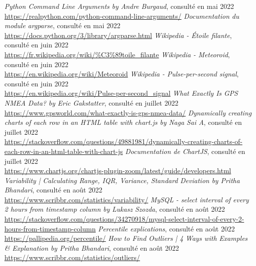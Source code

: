 \documentclass[11pt]{article}
\begin{document}
\begin{thebibliography}{100}
    \textit{Python Command Line Arguments by Andre Burgaud}, consulté en mai 2022\\\url{https://realpython.com/python-command-line-arguments/}
    \textit{Documentation du module argparse}, consulté en mai 2022\\\url{https://docs.python.org/3/library/argparse.html}
    \textit{Wikipedia - Étoile filante}, consulté en juin 2022\\\url{https://fr.wikipedia.org/wiki/%C3%89toile_filante}
    \textit{Wikipedia - Meteoroid}, consulté en juin 2022\\\url{https://en.wikipedia.org/wiki/Meteoroid}
    \textit{Wikipedia - Pulse-per-second signal}, consulté en juin 2022\\\url{https://en.wikipedia.org/wiki/Pulse-per-second_signal}
    \textit{What Exactly Is GPS NMEA Data? by Eric Gakstatter}, consulté en juillet 2022\\\url{https://www.gpsworld.com/what-exactly-is-gps-nmea-data/}
    \textit{Dynamically creating charts of each row in an HTML table with chart.js by Naga Sai A}, consulté en juillet 2022\\\url{https://stackoverflow.com/questions/49881981/dynamically-creating-charts-of-each-row-in-an-html-table-with-chart-js}
    \textit{Documentation de ChartJS}, consulté en juillet 2022\\\url{https://www.chartjs.org/chartjs-plugin-zoom/latest/guide/developers.html}
    \textit{Variability | Calculating Range, IQR, Variance, Standard Deviation by Pritha Bhandari}, consulté en août 2022\\\url{https://www.scribbr.com/statistics/variability/}
    \textit{MySQL - select interval of every 2 hours from timestamp column by Lukasz Szozda}, consulté en août 2022\\\url{https://stackoverflow.com/questions/34270918/mysql-select-interval-of-every-2-hours-from-timestamp-column}
    \textit{Percentile explications}, consulté en août 2022\\\url{https://pallipedia.org/percentile/}
    \textit{How to Find Outliers | 4 Ways with Examples \& Explanation by Pritha Bhandari}, consulté en août 2022\\\url{https://www.scribbr.com/statistics/outliers/}
\end{thebibliography}
\end{document}

